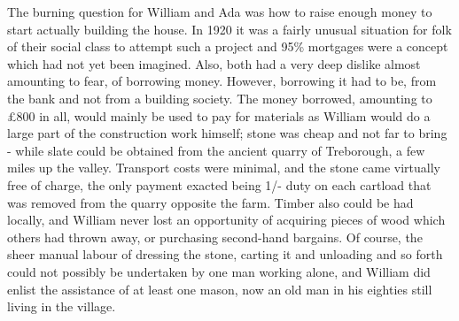 The burning question for William and Ada was how to raise enough money to start actually building the house. In 1920 it was a fairly unusual situation for folk of their social class to attempt such a project and 95\% mortgages were a concept which had not yet been imagined. Also, both had a very deep dislike almost amounting to fear, of borrowing money. However, borrowing it had to be, from the bank and not from a building society. The money borrowed, amounting to £800 in all, would mainly be used to pay for materials as William would do a large part of the construction work himself; stone was cheap and not far to bring - while slate could be obtained from the ancient quarry of Treborough, a few miles up the valley. Transport costs were minimal, and the stone came virtually free of charge, the only payment exacted being 1/- duty on each cartload that was removed from the quarry opposite the farm. Timber also could be had locally, and William never lost an opportunity of acquiring pieces of wood which others had thrown away, or purchasing second-hand bargains. Of course, the sheer manual labour of dressing the stone, carting it and unloading and so forth could not possibly be undertaken by one man working alone, and William did enlist the assistance of at least one mason, now an old man in his eighties still living in the village.

